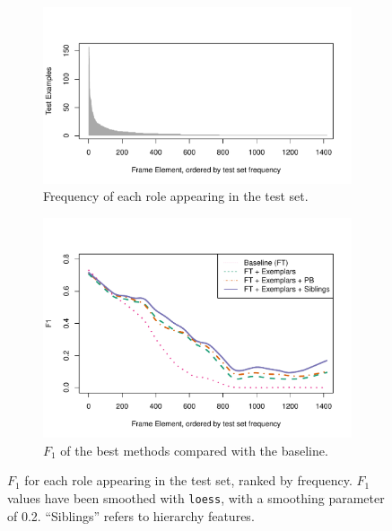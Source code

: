 \documentclass[11pt,a4paper]{article}
\newcommand{\ensuretext}[1]{#1}
\newcommand{\nasmarker}{\ensuretext{\textcolor{blue}{\ensuremath{^{\textsc{NA}}_{\textsc{S}}}}}}
\newcommand{\arkcomment}[3]{\ensuretext{\textcolor{#3}{[#1 #2]}}}
\newcommand{\nascomment}[1]{\arkcomment{\nasmarker}{#1}{blue}}
\begin{document}
\begin{figure}[!t]
	\begin{subfigure}[b]{0.5\textwidth}
		\includegraphics[width=\textwidth,trim = 0 0.5cm 0 1cm]{fig/num_instances}
		\caption{Frequency of each role appearing in the test set.}\label{fig:num_inst}
	\end{subfigure}
	\begin{subfigure}[b]{0.5\textwidth}
		\includegraphics[width=\textwidth,trim = 0 0 0 1.5cm]{fig/f1_sorted_by_num_instances}
		\caption{$F_1$ of the best methods compared with the baseline.}\label{fig:coolplot}
	\end{subfigure}
	\caption{$F_1$ for each role appearing in the test
	set, ranked by frequency. $F_1$ values have been smoothed with \texttt{loess}, with
	a smoothing parameter of 0.2. ``Siblings'' refers to hierarchy features.}
\end{figure}
\end{document}
